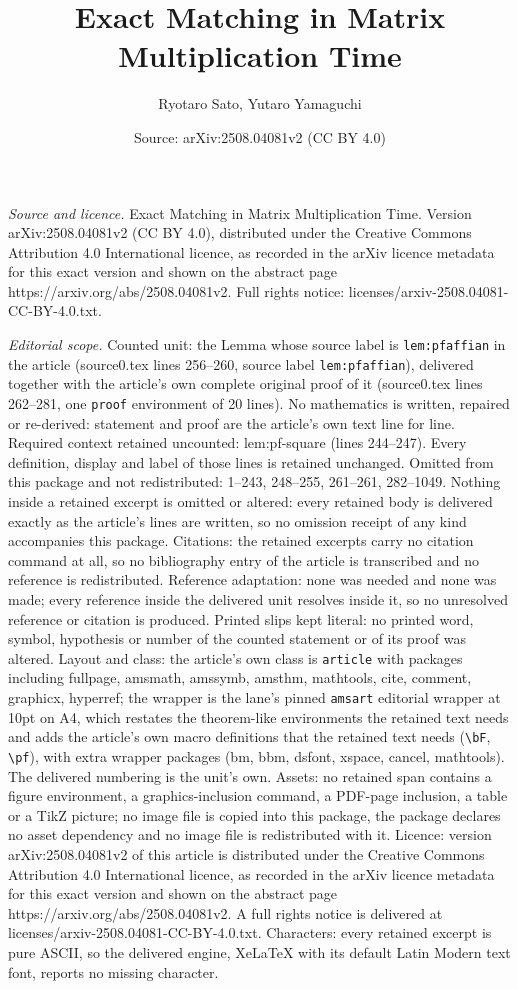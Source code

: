 \documentclass[10pt,a4paper]{amsart}
\title[Exact Matching in Matrix Multiplication Time]{Exact Matching in Matrix Multiplication Time}
\author{Ryotaro Sato, Yutaro Yamaguchi}
\date{Source: arXiv:2508.04081v2 (CC BY 4.0)}
\begin{document}
\maketitle

\noindent\emph{Source and licence.} Exact Matching in Matrix Multiplication Time. Version arXiv:2508.04081v2 (CC BY 4.0), distributed under the Creative Commons Attribution 4.0 International licence, as recorded in the arXiv licence metadata for this exact version and shown on the abstract page https://arxiv.org/abs/2508.04081v2. Full rights notice: licenses/arxiv-2508.04081-CC-BY-4.0.txt.\par\smallskip

\noindent\textit{Editorial scope.} Counted unit: the Lemma whose source label is \texttt{lem:pfaffian} in the article (source0.tex lines 256--260, source label \texttt{lem:pfaffian}), delivered together with the article's own complete original proof of it (source0.tex lines 262--281, one \texttt{proof} environment of 20 lines). No mathematics is written, repaired or re-derived: statement and proof are the article's own text line for line. Required context retained uncounted: lem:pf-square (lines 244--247). Every definition, display and label of those lines is retained unchanged. Omitted from this package and not redistributed: 1--243, 248--255, 261--261, 282--1049. Nothing inside a retained excerpt is omitted or altered: every retained body is delivered exactly as the article's lines are written, so no omission receipt of any kind accompanies this package. Citations: the retained excerpts carry no citation command at all, so no bibliography entry of the article is transcribed and no reference is redistributed. Reference adaptation: none was needed and none was made; every reference inside the delivered unit resolves inside it, so no unresolved reference or citation is produced. Printed slips kept literal: no printed word, symbol, hypothesis or number of the counted statement or of its proof was altered. Layout and class: the article's own class is \texttt{article} with packages including fullpage, amsmath, amssymb, amsthm, mathtools, cite, comment, graphicx, hyperref; the wrapper is the lane's pinned \texttt{amsart} editorial wrapper at 10pt on A4, which restates the theorem-like environments the retained text needs and adds the article's own macro definitions that the retained text needs (\texttt{\textbackslash bF}, \texttt{\textbackslash pf}), with extra wrapper packages (bm, bbm, dsfont, xspace, cancel, mathtools). The delivered numbering is the unit's own. Assets: no retained span contains a figure environment, a graphics-inclusion command, a PDF-page inclusion, a table or a TikZ picture; no image file is copied into this package, the package declares no asset dependency and no image file is redistributed with it. Licence: version arXiv:2508.04081v2 of this article is distributed under the Creative Commons Attribution 4.0 International licence, as recorded in the arXiv licence metadata for this exact version and shown on the abstract page https://arxiv.org/abs/2508.04081v2. A full rights notice is delivered at licenses/arxiv-2508.04081-CC-BY-4.0.txt. Characters: every retained excerpt is pure ASCII, so the delivered engine, XeLaTeX with its default Latin Modern text font, reports no missing character.
\end{document}
